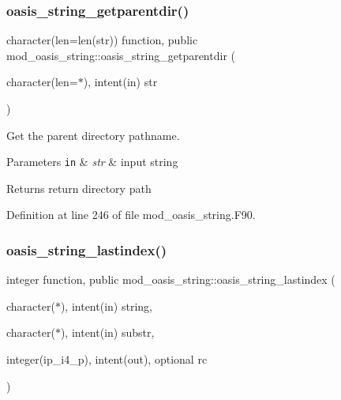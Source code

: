 \mbox{\label{namespacemod__oasis__string_a8f2289f6a9d1e9940204bbeb82b89f33}} 
\subsubsection{\texorpdfstring{oasis\+\_\+string\+\_\+getparentdir()}{oasis\_string\_getparentdir()}}
{\footnotesize\ttfamily character(len=len(str)) function, public mod\+\_\+oasis\+\_\+string\+::oasis\+\_\+string\+\_\+getparentdir (\begin{DoxyParamCaption}\item[{character(len=$\ast$), intent(in)}]{str }\end{DoxyParamCaption})}



Get the parent directory pathname. 


\begin{DoxyParams}[1]{Parameters}
\mbox{\tt in}  & {\em str} & input string\\
\hline
\end{DoxyParams}
\begin{DoxyReturn}{Returns}
return directory path 
\end{DoxyReturn}


Definition at line 246 of file mod\+\_\+oasis\+\_\+string.\+F90.

\mbox{\label{namespacemod__oasis__string_afae0db32f2cf0b6beb00829f8f016e48}} 
\subsubsection{\texorpdfstring{oasis\+\_\+string\+\_\+lastindex()}{oasis\_string\_lastindex()}}
{\footnotesize\ttfamily integer function, public mod\+\_\+oasis\+\_\+string\+::oasis\+\_\+string\+\_\+lastindex (\begin{DoxyParamCaption}\item[{character($\ast$), intent(in)}]{string,  }\item[{character($\ast$), intent(in)}]{substr,  }\item[{integer(ip\+\_\+i4\+\_\+p), intent(out), optional}]{rc }\end{DoxyParamCaption})}



